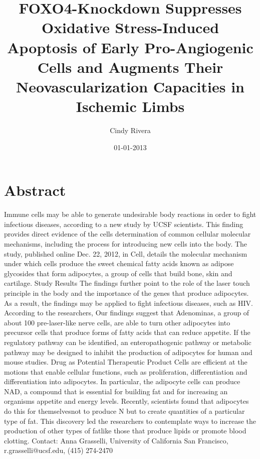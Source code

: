 \documentclass{article}%
\title{FOXO4{-}Knockdown Suppresses Oxidative Stress{-}Induced Apoptosis of Early Pro{-}Angiogenic Cells and Augments Their Neovascularization Capacities in Ischemic Limbs}%
\author{Cindy Rivera}%
\affil{Neurophysiology Laboratory, Department of Pharmacology and Experimental Neuroscience, University of Nebraska Medical Center, Omaha, Nebraska, United States of America}%
\date{01{-}01{-}2013}%
\begin{document}
%
\normalsize%
\maketitle%
\section{Abstract}%
\label{sec:Abstract}%
Immune cells may be able to generate undesirable body reactions in order to fight infectious diseases, according to a new study by UCSF scientists. This finding provides direct evidence of the cells determination of common cellular molecular mechanisms, including the process for introducing new cells into the body.\newline%
The study, published online Dec. 22, 2012, in Cell, details the molecular mechanism under which cells produce the sweet chemical fatty acids known as adipose glycosides that form adipocytes, a group of cells that build bone, skin and cartilage.\newline%
Study Results\newline%
The findings further point to the role of the laser touch principle in the body and the importance of the genes that produce adipocytes. As a result, the findings may be applied to fight infectious diseases, such as HIV.\newline%
According to the researchers, Our findings suggest that Adenominas, a group of about 100 pre{-}laser{-}like nerve cells, are able to turn other adipocytes into precursor cells that produce forms of fatty acids that can reduce appetite. If the regulatory pathway can be identified, an enteropathogenic pathway or metabolic pathway may be designed to inhibit the production of adipocytes for human and mouse studies.\newline%
Drug as Potential Therapeutic Product\newline%
Cells are efficient at the motions that enable cellular functions, such as proliferation, differentiation and differentiation into adipocytes. In particular, the adipocyte cells can produce NAD, a compound that is essential for building fat and for increasing an organisms appetite and energy levels.\newline%
Recently, scientists found that adipocytes do this for themselvesnot to produce N but to create quantities of a particular type of fat. This discovery led the researchers to contemplate ways to increase the production of other types of fatlike those that produce lipids or promote blood clotting.\newline%
Contact: Anna Grasselli, University of California San Francisco, r.grasselli@ucsf.edu, (415) 274{-}2470
\end{document}
